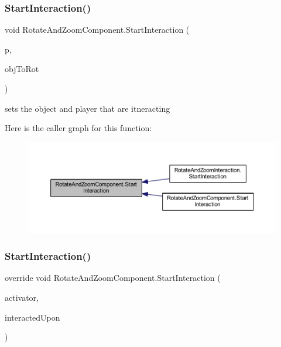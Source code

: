 \subsubsection{\texorpdfstring{Start\+Interaction()}{StartInteraction()}\hspace{0.1cm}{\footnotesize\ttfamily [1/2]}}
{\footnotesize\ttfamily void Rotate\+And\+Zoom\+Component.\+Start\+Interaction (\begin{DoxyParamCaption}\item[{\mbox{\hyperlink{class_player}{Player}}}]{p,  }\item[{Transform}]{obj\+To\+Rot }\end{DoxyParamCaption})}



sets the object and player that are itneracting 

Here is the caller graph for this function\+:
\nopagebreak
\begin{figure}[H]
\begin{center}
\leavevmode
\includegraphics[width=350pt]{class_rotate_and_zoom_component_a1afdb59de9b4b255456351189e2f6932_icgraph}
\end{center}
\end{figure}
\mbox{\label{class_rotate_and_zoom_component_ac6afb9569858cf59c584c7bdfac41def}} 
\subsubsection{\texorpdfstring{Start\+Interaction()}{StartInteraction()}\hspace{0.1cm}{\footnotesize\ttfamily [2/2]}}
{\footnotesize\ttfamily override void Rotate\+And\+Zoom\+Component.\+Start\+Interaction (\begin{DoxyParamCaption}\item[{Game\+Object}]{activator,  }\item[{Game\+Object}]{interacted\+Upon }\end{DoxyParamCaption})\hspace{0.3cm}{\ttfamily [virtual]}}



